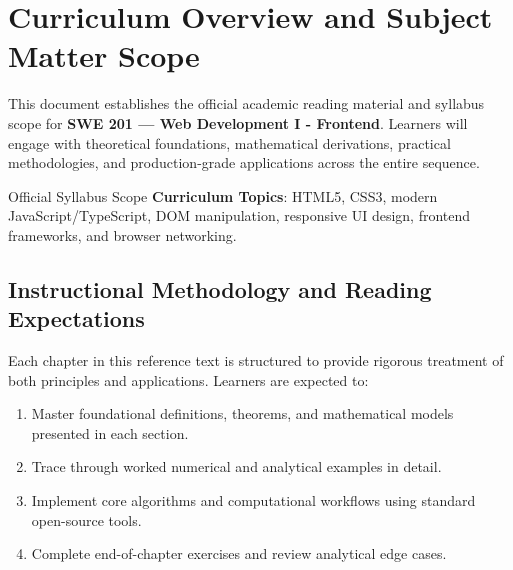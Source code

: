 \section{Curriculum Overview and Subject Matter Scope}

This document establishes the official academic reading material and syllabus scope for \textbf{SWE 201 --- Web Development I - Frontend}. Learners will engage with theoretical foundations, mathematical derivations, practical methodologies, and production-grade applications across the entire sequence.

\begin{InsightBox}{Official Syllabus Scope}
  \textbf{Curriculum Topics}: HTML5, CSS3, modern JavaScript/TypeScript, DOM manipulation, responsive UI design, frontend frameworks, and browser networking.
\end{InsightBox}

\subsection{Instructional Methodology and Reading Expectations}

Each chapter in this reference text is structured to provide rigorous treatment of both principles and applications. Learners are expected to:
\begin{enumerate}
  \item Master foundational definitions, theorems, and mathematical models presented in each section.
  \item Trace through worked numerical and analytical examples in detail.
  \item Implement core algorithms and computational workflows using standard open-source tools.
  \item Complete end-of-chapter exercises and review analytical edge cases.
\end{enumerate}

